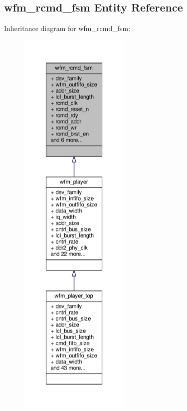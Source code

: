 \subsection{wfm\+\_\+rcmd\+\_\+fsm Entity Reference}
\label{classwfm__rcmd__fsm}


Inheritance diagram for wfm\+\_\+rcmd\+\_\+fsm\+:\nopagebreak
\begin{figure}[H]
\begin{center}
\leavevmode
\includegraphics[height=550pt]{dc/de3/classwfm__rcmd__fsm__inherit__graph}
\end{center}
\end{figure}


